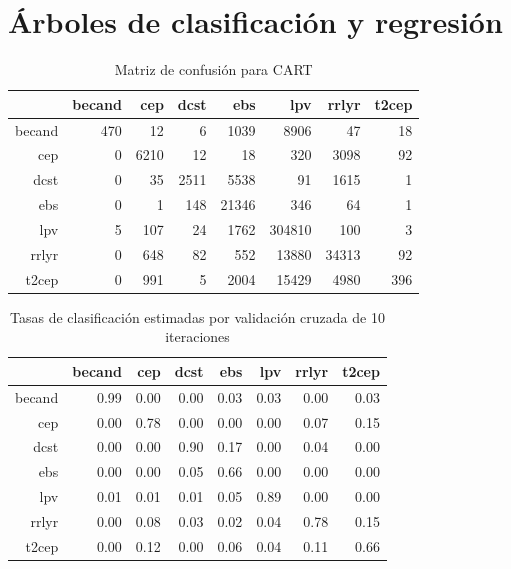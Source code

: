 \documentclass[letterpaper,12pt]{book}
\begin{document}
\section{Árboles de clasificación y regresión}
\begin{table}[ht]
\centering
\caption{Matriz de confusión para CART} 
\label{cuadro:cmCart}
\begin{tabular}{rrrrrrrr}
  \hline
 & becand & cep & dcst & ebs & lpv & rrlyr & t2cep \\ 
  \hline
becand & 470 &  12 &   6 & 1039 & 8906 &  47 &  18 \\ 
  cep &   0 & 6210 &  12 &  18 & 320 & 3098 &  92 \\ 
  dcst &   0 &  35 & 2511 & 5538 &  91 & 1615 &   1 \\ 
  ebs &   0 &   1 & 148 & 21346 & 346 &  64 &   1 \\ 
  lpv &   5 & 107 &  24 & 1762 & 304810 & 100 &   3 \\ 
  rrlyr &   0 & 648 &  82 & 552 & 13880 & 34313 &  92 \\ 
  t2cep &   0 & 991 &   5 & 2004 & 15429 & 4980 & 396 \\ 
   \hline
\end{tabular}
\end{table}

\begin{table}[ht]
\centering
\caption{Tasas de clasificación estimadas por validación cruzada de 10 iteraciones} 
\label{table:cmCvart}
\begin{tabular}{rrrrrrrr}
  \hline
 & becand & cep & dcst & ebs & lpv & rrlyr & t2cep \\ 
  \hline
becand & 0.99 & 0.00 & 0.00 & 0.03 & 0.03 & 0.00 & 0.03 \\ 
  cep & 0.00 & 0.78 & 0.00 & 0.00 & 0.00 & 0.07 & 0.15 \\ 
  dcst & 0.00 & 0.00 & 0.90 & 0.17 & 0.00 & 0.04 & 0.00 \\ 
  ebs & 0.00 & 0.00 & 0.05 & 0.66 & 0.00 & 0.00 & 0.00 \\ 
  lpv & 0.01 & 0.01 & 0.01 & 0.05 & 0.89 & 0.00 & 0.00 \\ 
  rrlyr & 0.00 & 0.08 & 0.03 & 0.02 & 0.04 & 0.78 & 0.15 \\ 
  t2cep & 0.00 & 0.12 & 0.00 & 0.06 & 0.04 & 0.11 & 0.66 \\ 
   \hline
\end{tabular}
\end{table}
\end{document}

